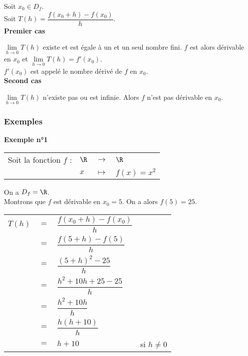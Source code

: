 \vspace*{.3cm}

Soit $x_0 \in D_f$. \\

Soit $T(h) = \dfrac{f(x_0 + h) - f(x_0)}{h}$. \\

\textbf{Premier cas}

$\lim\limits_{h \to 0} T(h)$ existe et est égale à un et un seul nombre fini. $f$ est alors dérivable en $x_0$ et $\lim\limits_{h \to 0} T(h) = f'(x_0)$. \\

$f'(x_0)$ est appelé le nombre dérivé de $f$ en $x_0$. \\

\textbf{Second cas}

$\lim\limits_{h \to 0} T(h)$ n'existe pas ou est infinie. Alors $f$ n'est pas dérivable en $x_0$. \\

\newpage

\vspace*{-1.8cm}

\subsubsection{Exemples}

\textbf{Exemple n°1} \\

\begin{tabular}{llll}
Soit la fonction $f$ : & $\R$ & $\longrightarrow$ & $\R$ \\
& $x$ & $\longmapsto$ & $f\left(x\right) = x^2$ \\
\end{tabular}

On a $D_f = \R$. \\

Montrons que $f$ est dérivable en $x_0 = 5$. On a alors $f(5) = 25$. \\

\begin{tabular}{llll}
$T(h)$ & $=$ & $\dfrac{f(x_0 + h) - f(x_0)}{h}$ & \vspace*{.3cm} \\
& $=$ & $\dfrac{f(5 + h) - f(5)}{h}$ & \vspace*{.3cm} \\
& $=$ & $\dfrac{(5+h)^2 - 25}{h}$ & \vspace*{.3cm} \\
& $=$ & $\dfrac{h^2 + 10h + 25 - 25}{h}$ & \vspace*{.3cm} \\
& $=$ & $\dfrac{h^2 + 10h}{h}$ & \vspace*{.3cm} \\
& $=$ & $\dfrac{h\left(h+ 10\right)}{h}$ & \vspace*{.3cm} \\
& $=$ & $ h + 10$ & si $h \neq 0$ \vspace*{.3cm} \\
\end{tabular}

